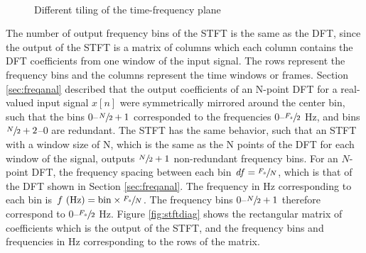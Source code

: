 \documentclass[report.tex]{subfiles}
\begin{document}
\begin{figure}[ht]
	\centering
	\\
	\caption{Different tiling of the time-frequency plane \parencite[326, 327]{gabordiagrams}}
	\label{fig:gabortf}
\end{figure}

The number of output frequency bins of the STFT is the same as the DFT, since the output of the STFT is a matrix of columns which each column contains the DFT coefficients from one window of the input signal. The rows represent the frequency bins and the columns represent the time windows or frames. Section \ref{sec:freqanal} described that the output coefficients of an N-point DFT for a real-valued input signal $x[n]$ were symmetrically mirrored around the center bin, such that the bins 0--$\sfrac{N}{2}+1$ corresponded to the frequencies 0--$\sfrac{F_{s}}{2}$ Hz, and bins $\sfrac{N}{2}+2$--0 are redundant. The STFT has the same behavior, such that an STFT with a window size of N, which is the same as the N points of the DFT for each window of the signal, outputs $\sfrac{N}{2}+1$ non-redundant frequency bins. For an $N$-point DFT, the frequency spacing between each bin $\mathit{df} = \sfrac{F_{s}}{N}$, which is that of the DFT shown in Section \ref{sec:freqanal}. The frequency in Hz corresponding to each bin is $f \text{ (Hz)} = \text{bin}\times\sfrac{F_{s}}{N}$. The frequency bins 0--$\sfrac{N}{2}+1$ therefore correspond to 0--$\sfrac{F_{s}}{2}$ Hz. Figure \ref{fig:stftdiag} shows the rectangular matrix of coefficients which is the output of the STFT, and the frequency bins and frequencies in Hz corresponding to the rows of the matrix.
\end{document}
